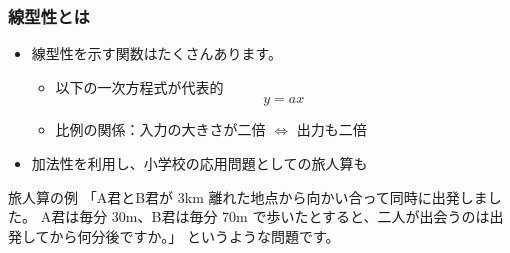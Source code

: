 \documentclass[unicode,12pt,aspectratio=169]{beamer}
\begin{document}
\begin{frame}
	\frametitle{線型性とは}
		\begin{itemize}
			\item 線型性を示す関数はたくさんあります。
			\begin{itemize}
				\item 以下の一次方程式が代表的
				\begin{equation*}
					y=ax
				\end{equation*}
				\item 比例の関係：入力の大きさが二倍 $\Leftrightarrow$ 出力も二倍
			\end{itemize}
			\item 加法性を利用し、小学校の応用問題としての旅人算も
		\end{itemize}
		\begin{itembox}[l]{旅人算の例}
			「A君とB君が 3km 離れた地点から向かい合って同時に出発しました。
		A君は毎分 30m、B君は毎分 70m で歩いたとすると、二人が出会うのは出発してから何分後ですか。」
		というような問題です。
		\end{itembox}
\end{frame}
\end{document}
